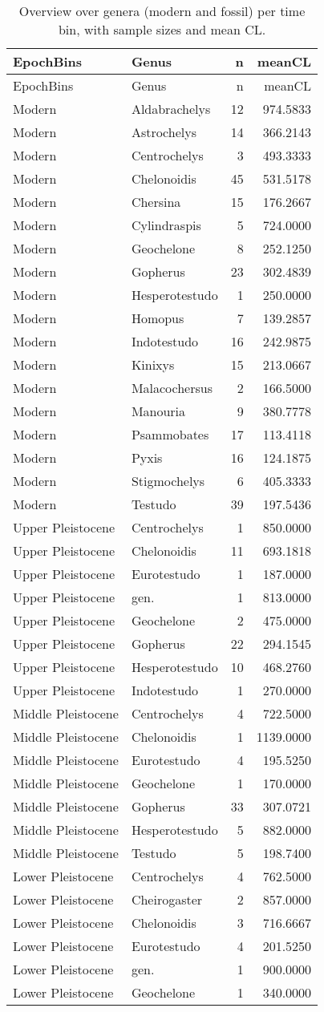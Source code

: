 \begin{longtable}[]{@{}llrr@{}}
	\caption[Genera per time bins]{Overview over genera (modern and fossil) per time bin, with
		sample sizes and mean CL.}
	\label{tab:GenBins}\tabularnewline
	\toprule
	EpochBins & Genus & n & meanCL\tabularnewline
	\midrule
	\endfirsthead
	\toprule
	EpochBins & Genus & n & meanCL\tabularnewline
	\midrule
	\endhead
	Modern & Aldabrachelys & 12 & 974.5833\tabularnewline
	Modern & Astrochelys & 14 & 366.2143\tabularnewline
	Modern & Centrochelys & 3 & 493.3333\tabularnewline
	Modern & Chelonoidis & 45 & 531.5178\tabularnewline
	Modern & Chersina & 15 & 176.2667\tabularnewline
	Modern & Cylindraspis & 5 & 724.0000\tabularnewline
	Modern & Geochelone & 8 & 252.1250\tabularnewline
	Modern & Gopherus & 23 & 302.4839\tabularnewline
	Modern & Hesperotestudo & 1 & 250.0000\tabularnewline
	Modern & Homopus & 7 & 139.2857\tabularnewline
	Modern & Indotestudo & 16 & 242.9875\tabularnewline
	Modern & Kinixys & 15 & 213.0667\tabularnewline
	Modern & Malacochersus & 2 & 166.5000\tabularnewline
	Modern & Manouria & 9 & 380.7778\tabularnewline
	Modern & Psammobates & 17 & 113.4118\tabularnewline
	Modern & Pyxis & 16 & 124.1875\tabularnewline
	Modern & Stigmochelys & 6 & 405.3333\tabularnewline
	Modern & Testudo & 39 & 197.5436\tabularnewline
	Upper Pleistocene & Centrochelys & 1 & 850.0000\tabularnewline
	Upper Pleistocene & Chelonoidis & 11 & 693.1818\tabularnewline
	Upper Pleistocene & Eurotestudo & 1 & 187.0000\tabularnewline
	Upper Pleistocene & gen. & 1 & 813.0000\tabularnewline
	Upper Pleistocene & Geochelone & 2 & 475.0000\tabularnewline
	Upper Pleistocene & Gopherus & 22 & 294.1545\tabularnewline
	Upper Pleistocene & Hesperotestudo & 10 & 468.2760\tabularnewline
	Upper Pleistocene & Indotestudo & 1 & 270.0000\tabularnewline
	Middle Pleistocene & Centrochelys & 4 & 722.5000\tabularnewline
	Middle Pleistocene & Chelonoidis & 1 & 1139.0000\tabularnewline
	Middle Pleistocene & Eurotestudo & 4 & 195.5250\tabularnewline
	Middle Pleistocene & Geochelone & 1 & 170.0000\tabularnewline
	Middle Pleistocene & Gopherus & 33 & 307.0721\tabularnewline
	Middle Pleistocene & Hesperotestudo & 5 & 882.0000\tabularnewline
	Middle Pleistocene & Testudo & 5 & 198.7400\tabularnewline
	Lower Pleistocene & Centrochelys & 4 & 762.5000\tabularnewline
	Lower Pleistocene & Cheirogaster & 2 & 857.0000\tabularnewline
	Lower Pleistocene & Chelonoidis & 3 & 716.6667\tabularnewline
	Lower Pleistocene & Eurotestudo & 4 & 201.5250\tabularnewline
	Lower Pleistocene & gen. & 1 & 900.0000\tabularnewline
	Lower Pleistocene & Geochelone & 1 & 340.0000\tabularnewline

\end{longtable}
